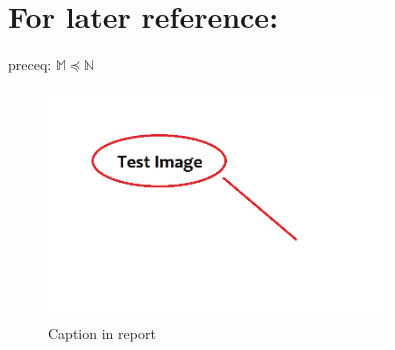 \documentclass[11pt, a4paper]{article}
\begin{document}




\section{For later reference:}
	preceq: $\mathbb{M} \preceq \mathbb{N}$
	\begin{figure}[graphics_test]
		\begin{center}
			\includegraphics[width=0.8\textwidth]{pic1.jpg}
		\end{center}
		\caption[Caption in List of Figures]{Caption in report}
	\end{figure}


\appendix
	



\end{document}
